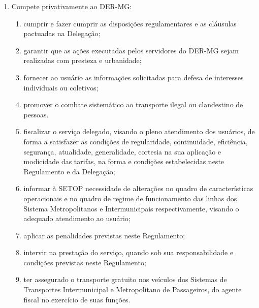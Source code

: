 \begin{enumerate}[resume, label=Art. \arabic*]

\item Compete privativamente ao DER-MG:

\begin{enumerate}[label=\roman*.]

\item cumprir e fazer cumprir as disposições regulamentares e as cláusulas pactuadas na Delegação;

\item garantir que as ações executadas pelos servidores do DER-MG sejam realizadas com presteza e urbanidade;

\item fornecer ao usuário as informações solicitadas para defesa de interesses individuais ou coletivos;

\item promover o combate sistemático ao transporte ilegal ou clandestino de pessoas.

\item fiscalizar o serviço delegado, visando o pleno atendimento dos usuários, de forma a satisfazer as condições de regularidade, continuidade, eficiência, segurança, atualidade, generalidade, cortesia na sua aplicação e modicidade das tarifas, na forma e condições estabelecidas neste Regulamento e da Delegação;

\item informar à SETOP necessidade de alterações no quadro de características operacionais e no quadro de regime de funcionamento das linhas dos Sistema Metropolitanos e Intermunicipais respectivamente, visando o adequado atendimento ao usuário;

\item aplicar as penalidades previstas neste Regulamento;

\item intervir na prestação do serviço, quando sob sua responsabilidade e condições previstas neste Regulamento;

\item ter assegurado o transporte gratuito nos veículos dos Sistemas de Transportes Intermunicipal e Metropolitano de Passageiros, do agente fiscal no exercício de suas funções.

\end{enumerate}

\end{enumerate}